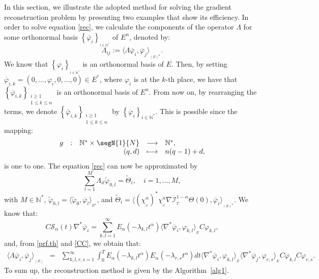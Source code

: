 \documentclass{article}
\begin{document}
In this section, we illustrate the adopted method for solving 
the gradient reconstruction problem by presenting
two examples that show its efficiency. In order to solve 
equation \eqref{rec}, we calculate the components of the operator 
$\Lambda$ for some orthonormal basis 
$\left\{\overline{\varphi}_i\right\}_{_{i\in \mathbb{N}^*}}$ 
of $E^n$, denoted by:
$$
\Lambda_{ij}:= \langle \Lambda\overline{\varphi}_i,
\overline{\varphi}_j\rangle_{_{(E)^n}}. 
$$
We know that $\left\{\varphi_{i}\right\}_{_{i\in \mathbb{N}^*}}$ 
is an orthonormal basis of $E$. Then, by setting 
$\overline{\varphi}_{i,k} = \left(0,\ldots,\varphi_{i},0,\ldots,0\right)\in E^{^n}$, 
where $\varphi_{i}$ is at the $k$-th place, we have that 
$\left\{\overline{\varphi}_{i,k}\right\}_{\substack{i\geq 1 \\ 1\leq k \leq n }}$ 
is an orthonormal basis of $E^n$. From now on, by rearranging the terms, we denote
$\left\{\overline{\varphi}_{i,k}\right\}_{\substack{  i\geq 1 \\ 1\leq k \leq n }}$ 
by $\left\{\overline{\varphi}_{i}\right\}_{i\in\mathbb{N}^*}$. This is possible 
since the mapping:
$$
\begin{array}{lllll}
g & : & \mathbb{N}^*\times \segN{1}{N} 
& \longrightarrow & \mathbb{N}^*,\\
& & \hfill (q,d)& \longmapsto & n(q-1)+d,
\end{array}
$$  
is one to one. The equation \eqref{rec} can now be approximated by 
\begin{equation}
\label{app.rec}
\displaystyle\sum_{l=1}^{M}\Lambda_{il}\tilde{\varphi}_{0,l} 
= \tilde{\Theta}_{i}, \quad i = 1,\ldots,M, 
\end{equation}
with $M\in\mathbb{N}^*$, $\tilde{\varphi}_{0,l} 
= \langle \tilde{\varphi}_0, \overline{\varphi}_l \rangle_{_{E^n}}$, 
and $\tilde{\Theta}_i = \langle (\chi_{_\omega}^{n})^*\chi_{_\omega}^{n}
\nabla\mathcal{I}_{_{T^-}}^{1-\alpha}
\Theta(0),\overline{\varphi}_i \rangle_{_{(E)^n}}$.
We know that:
\begin{equation}
\label{CC}
C\mathcal{S}_\alpha(t)\nabla^*\overline{\varphi}_i 
= \displaystyle\sum_{k,l = 1}^{\infty} E_\alpha(-\lambda_{k,l}
t^\alpha) \langle \nabla^*\overline{\varphi}_i,
\varphi_{k,l} \rangle_{_{E}}C\varphi_{k,l},
\end{equation}
and, from  \eqref{prf.th} and \eqref{CC}, we obtain that:
\begin{equation*}
\begin{array}{llll}
\langle \Lambda\overline{\varphi}_i,\overline{\varphi}_j
\rangle_{_{(E)}}& = & \displaystyle\sum_{k,l,r,s=1}^{\infty}
\int_{0}^{T} E_\alpha(-\lambda_{k,l}t^\alpha)
E_\alpha(-\lambda_{r,s}t^\alpha)dt \langle \nabla^*\overline{\varphi}_i,
\varphi_{k,l} \rangle_{_{E}}\langle \nabla^*\overline{\varphi}_j,
\varphi_{r,s} \rangle_{_{E}}C\varphi_{k,l}C\varphi_{r,s}.
\end{array}
\end{equation*}
To sum up, the reconstruction method is given
by the Algorithm~\ref{alg1}.
\end{document}
